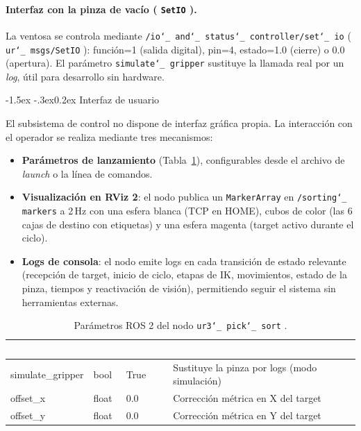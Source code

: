 \documentclass[12pt,a4paper]{article}
\makeatletter
\renewcommand\subsubsection{\@startsection{subsubsection}{3}{\z@}%
  {-1.5ex \@plus -.3ex}{0.2ex}%
  {\normalsize\bfseries\color{MediumBlue}}}
\newcommand{\rowA}{\rowcolor{LightGray}}
\newcommand{\rowB}{\rowcolor{white}}
\newcommand{\code}[1]{%
  \begingroup
  \def\_{\char`_\penalty0 }%
  \def\/{\char`/\penalty0 }%
  \texttt{\small #1}%
  \endgroup}
\makeatother
\begin{document}
\paragraph{Interfaz con la pinza de vacío (\code{SetIO}).}
La ventosa se controla mediante \code{/io\_and\_status\_controller/set\_io} (\code{ur\_msgs/SetIO}):
función=1 (salida digital), pin=4, estado=1.0 (cierre) o 0.0 (apertura). El parámetro
\code{simulate\_gripper} sustituye la llamada real por un \textit{log}, útil para desarrollo sin hardware.


\subsubsection{Interfaz de usuario}

El subsistema de control no dispone de interfaz gráfica propia. La interacción con el operador se realiza
mediante tres mecanismos:
\begin{itemize}
  \item \textbf{Parámetros de lanzamiento} (Tabla~\ref{tab:ctrl-params}), configurables desde el archivo
        de \textit{launch} o la línea de comandos.
  \vspace{6.5pt}
  \item \textbf{Visualización en RViz 2}: el nodo publica un \code{MarkerArray} en \code{/sorting\_markers}
        a 2\,Hz con una esfera blanca (TCP en HOME), cubos de color (las 6 cajas de destino con etiquetas)
        y una esfera magenta (target activo durante el ciclo).
  \vspace{6.5pt}
  \item \textbf{Logs de consola}: el nodo emite logs en cada transición de estado relevante (recepción de
        target, inicio de ciclo, etapas de IK, movimientos, estado de la pinza, tiempos y reactivación de
        visión), permitiendo seguir el sistema sin herramientas externas.
\end{itemize}

\begin{table}[H]
\centering
\caption{Parámetros ROS 2 del nodo \code{ur3\_pick\_sort}.}
\label{tab:ctrl-params}
\small
\renewcommand{\arraystretch}{1.25}
\begin{tabularx}{\textwidth}{|>{\ttfamily}l|l|l|>{\RaggedRight\arraybackslash}X|}
  \hline
  \rowcolor{BlueHeader}
  \textcolor{white}{\bfseries Parámetro} &
  \textcolor{white}{\bfseries Tipo} &
  \textcolor{white}{\bfseries Defecto} &
  \textcolor{white}{\bfseries Descripción} \\
  \hline
  \rowA simulate\_gripper & bool & True & Sustituye la pinza por logs (modo simulación) \\
  \rowB offset\_x & float & 0.0 & Corrección métrica en X del target \\
  \rowA offset\_y & float & 0.0 & Corrección métrica en Y del target \\
  \hline
\end{tabularx}
\end{table}
\end{document}

